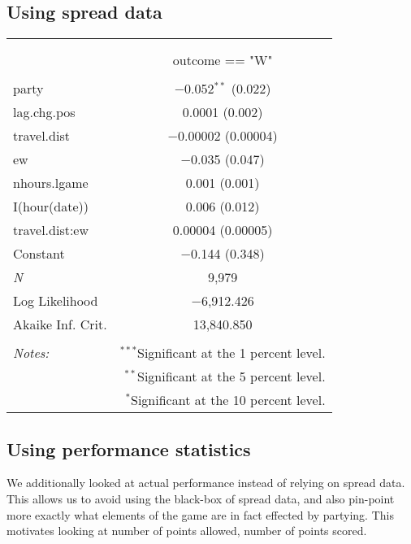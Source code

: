 \documentclass[letterpaper,12pt]{article}
\begin{document}
\subsection{Using spread data}
\begin{center}
\begin{tabular}{@{\extracolsep{5pt}}lc}  \\[-1.8ex]\hline  \hline \\[-1.8ex]  \\[-1.8ex] & outcome == "W" \\  \hline \\[-1.8ex]   party & $-$0.052$^{**}$ (0.022) \\    lag.chg.pos & 0.0001 (0.002) \\    travel.dist & $-$0.00002 (0.00004) \\    ew & $-$0.035 (0.047) \\    nhours.lgame & 0.001 (0.001) \\    I(hour(date)) & 0.006 (0.012) \\    travel.dist:ew & 0.00004 (0.00005) \\    Constant & $-$0.144 (0.348) \\   \textit{N} & 9,979 \\  Log Likelihood & $-$6,912.426 \\  Akaike Inf. Crit. & 13,840.850 \\  \hline  \hline \\[-1.8ex]  \textit{Notes:} & \multicolumn{1}{r}{$^{***}$Significant at the 1 percent level.} \\   & \multicolumn{1}{r}{$^{**}$Significant at the 5 percent level.} \\   & \multicolumn{1}{r}{$^{*}$Significant at the 10 percent level.} \\  \end{tabular} 
\end{center}


\subsection{Using performance statistics}
We additionally looked at actual performance instead of relying on spread data. 
This allows us to avoid using the black-box of spread data, and also pin-point
more exactly what elements of the game are in fact effected by partying.
This motivates looking at number of points allowed, number of points scored.
\end{document}
